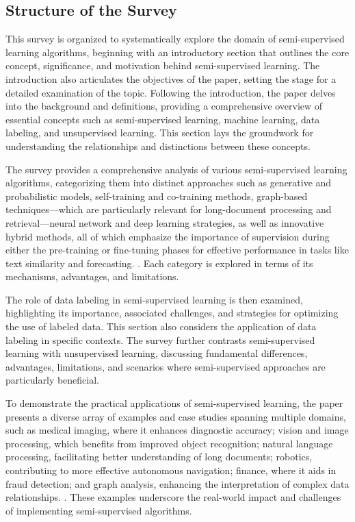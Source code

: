 \subsection{Structure of the Survey} \label{subsec:Structure of the Survey}

This survey is organized to systematically explore the domain of semi-supervised learning algorithms, beginning with an introductory section that outlines the core concept, significance, and motivation behind semi-supervised learning. The introduction also articulates the objectives of the paper, setting the stage for a detailed examination of the topic. Following the introduction, the paper delves into the background and definitions, providing a comprehensive overview of essential concepts such as semi-supervised learning, machine learning, data labeling, and unsupervised learning. This section lays the groundwork for understanding the relationships and distinctions between these concepts.



The survey provides a comprehensive analysis of various semi-supervised learning algorithms, categorizing them into distinct approaches such as generative and probabilistic models, self-training and co-training methods, graph-based techniques—which are particularly relevant for long-document processing and retrieval—neural network and deep learning strategies, as well as innovative hybrid methods, all of which emphasize the importance of supervision during either the pre-training or fine-tuning phases for effective performance in tasks like text similarity and forecasting. \cite{ginzburg2021selfsuperviseddocumentsimilarityranking,ullah2019graphconvolutionalnetworksanalysis}. Each category is explored in terms of its mechanisms, advantages, and limitations.



The role of data labeling in semi-supervised learning is then examined, highlighting its importance, associated challenges, and strategies for optimizing the use of labeled data. This section also considers the application of data labeling in specific contexts. The survey further contrasts semi-supervised learning with unsupervised learning, discussing fundamental differences, advantages, limitations, and scenarios where semi-supervised approaches are particularly beneficial.



To demonstrate the practical applications of semi-supervised learning, the paper presents a diverse array of examples and case studies spanning multiple domains, such as medical imaging, where it enhances diagnostic accuracy; vision and image processing, which benefits from improved object recognition; natural language processing, facilitating better understanding of long documents; robotics, contributing to more effective autonomous navigation; finance, where it aids in fraud detection; and graph analysis, enhancing the interpretation of complex data relationships. \cite{ginzburg2021selfsuperviseddocumentsimilarityranking}. These examples underscore the real-world impact and challenges of implementing semi-supervised algorithms.




